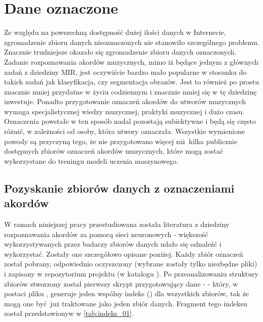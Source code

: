 \section{Dane oznaczone}

Ze względu na powszechną dostępność dużej ilości danych w Internecie, zgromadzenie zbioru danych
nieoznaczonych nie stanowiło szczególnego problemu. Znacznie trudniejsze okazało się zgromadzenie
zbioru danych oznaczonych. Zadanie rozpoznawania akordów muzycznych, mimo iż będące jednym z
głównych zadań z dziedziny MIR, jest oczywiście bardzo mało popularne w stosunku do takich
zadań jak klasyfikacja, czy segmentacja obrazów. Jest to również po prostu znacznie mniej przydatne
w życiu codziennym i znacznie mniej się w tę dziedzinę inwestuje. Ponadto przygotowanie oznaczeń
akordów do utworów muzycznych wymaga specjalistycznej wiedzy muzycznej, praktyki muzycznej i dużo
czasu. Oznaczenia powstałe w ten sposób nadal pozostają subiektywne i będą się często różnić, w
zależności od osoby, która utwory oznaczała. Wszystkie wymienione powody są przyczyną tego, że nie
przygotowano więcej niż kilka publicznie dostępnych zbiorów oznaczeń akordów muzycznych, które mogą
zostać wykorzystane do treningu modeli uczenia maszynowego.


\subsection{Pozyskanie zbiorów danych z oznaczeniami akordów}

W ramach niniejszej pracy przestudiowana została literatura z dziedziny rozpoznawania akordów za
pomocą sieci neuronowych - większość wykorzystywanych przez badaczy zbiorów danych udało się
odnaleźć i wykorzystać. Zostały one szczegółowo opisane poniżej. Każdy zbiór oznaczeń został
pobrany, odpowiednio oczyszczony (wybrane zostały tylko niezbędne pliki) i zapisany w repozytorium
projektu (w katalogu ). Po przeanalizowaniu struktury zbiorów stworzony został
pierwszy skrypt przygotowujący dane -  -
który, w postaci pliku , generuje jeden wspólny indeks () dla wszystkich
zbiorów, tak że mogą one być już traktowane jako jeden zbiór danych. Fragment tego indeksu został
przedstawionyw w \ref{tab:indeks_01}.

